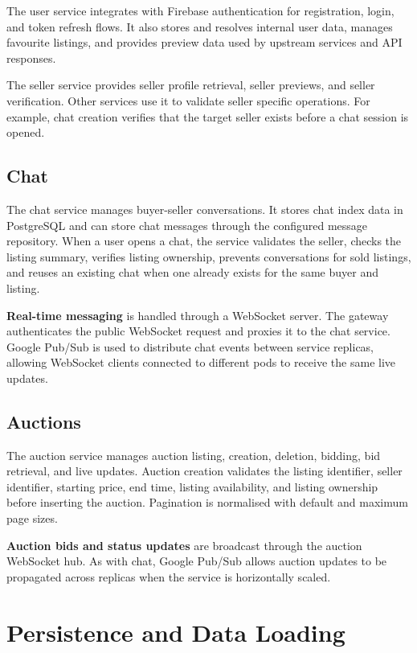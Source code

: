 The user service integrates with Firebase authentication for registration, login, and token refresh flows. It also stores and resolves internal user data, manages favourite listings, and provides preview data used by upstream services and API responses.

The seller service provides seller profile retrieval, seller previews, and seller verification. Other services use it to validate seller specific operations. For example, chat creation verifies that the target seller exists before a chat session is opened.

\subsection{Chat}

The chat service manages buyer-seller conversations. It stores chat index data in PostgreSQL and can store chat messages through the configured message repository. When a user opens a chat, the service validates the seller, checks the listing summary, verifies listing ownership, prevents conversations for sold listings, and reuses an existing chat when one already exists for the same buyer and listing.

\textbf{Real-time messaging} is handled through a WebSocket server. The gateway authenticates the public WebSocket request and proxies it to the chat service. Google Pub/Sub is used to distribute chat events between service replicas, allowing WebSocket clients connected to different pods to receive the same live updates.

\newpage

\subsection{Auctions}

The auction service manages auction listing, creation, deletion, bidding, bid retrieval, and live updates. Auction creation validates the listing identifier, seller identifier, starting price, end time, listing availability, and listing ownership before inserting the auction. Pagination is normalised with default and maximum page sizes.

\textbf{Auction bids and status updates} are broadcast through the auction WebSocket hub. As with chat, Google Pub/Sub allows auction updates to be propagated across replicas when the service is horizontally scaled.

\section{Persistence and Data Loading}

